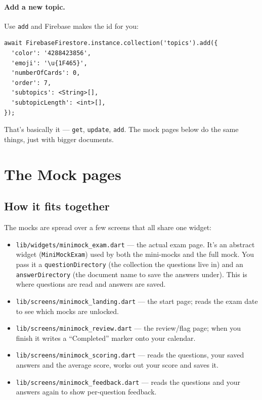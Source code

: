 \documentclass[11pt,a4paper]{article}
\newcommand{\file}[1]{\texttt{\small #1}}
\begin{document}
\paragraph{Add a new topic.} Use \verb|add| and Firebase makes the id for you:

\begin{lstlisting}
await FirebaseFirestore.instance.collection('topics').add({
  'color': '4288423856',
  'emoji': '\u{1F465}',
  'numberOfCards': 0,
  'order': 7,
  'subtopics': <String>[],
  'subtopicLength': <int>[],
});
\end{lstlisting}

\noindent That's basically it --- \verb|get|, \verb|update|, \verb|add|. The
mock pages below do the same things, just with bigger documents.

\section{The Mock pages}

\subsection{How it fits together}

The mocks are spread over a few screens that all share one widget:

\begin{itemize}[leftmargin=1.4em,itemsep=2pt]
  \item \file{lib/widgets/minimock\_exam.dart} --- the actual exam page. It's an
    abstract widget (\verb|MiniMockExam|) used by both the mini-mocks and the
    full mock. You pass it a \verb|questionDirectory| (the collection the
    questions live in) and an \verb|answerDirectory| (the document name to save
    the answers under). This is where questions are read and answers are saved.
  \item \file{lib/screens/minimock\_landing.dart} --- the start page; reads the
    exam date to see which mocks are unlocked.
  \item \file{lib/screens/minimock\_review.dart} --- the review/flag page; when
    you finish it writes a ``Completed'' marker onto your calendar.
  \item \file{lib/screens/minimock\_scoring.dart} --- reads the questions, your
    saved answers and the average score, works out your score and saves it.
  \item \file{lib/screens/minimock\_feedback.dart} --- reads the questions and
    your answers again to show per-question feedback.
\end{itemize}
\end{document}
